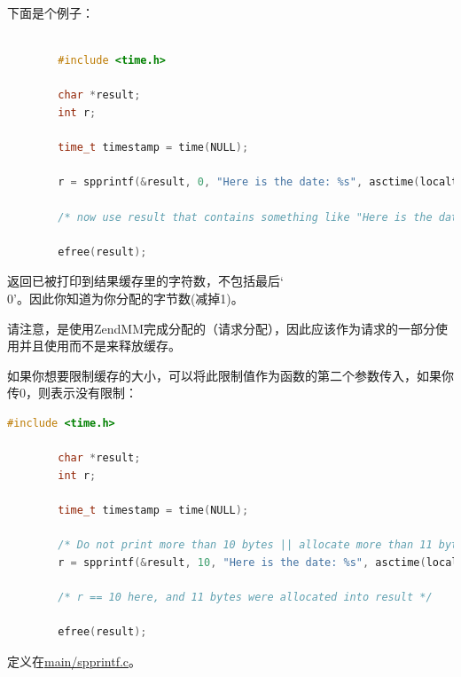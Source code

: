 下面是个例子：

\begin{lstlisting}[language=c]

        #include <time.h>

        char *result;
        int r;
        
        time_t timestamp = time(NULL);
        
        r = spprintf(&result, 0, "Here is the date: %s", asctime(localtime(&timestamp)));
        
        /* now use result that contains something like "Here is the date: Thu Jun 15 19:12:51 2017\n" */
        
        efree(result);  

\end{lstlisting} 


返回已被打印到结果缓存里的字符数，不包括最后‘\\0’。因此你知道为你分配的字节数(减掉1)。

请注意，是使用ZendMM完成分配的（请求分配），因此应该作为请求的一部分使用并且使用而不是来释放缓存。


如果你想要限制缓存的大小，可以将此限制值作为函数的第二个参数传入，如果你传0，则表示没有限制：

\begin{lstlisting}[language=c]
        #include <time.h>

        char *result;
        int r;

        time_t timestamp = time(NULL);

        /* Do not print more than 10 bytes || allocate more than 11 bytes */
        r = spprintf(&result, 10, "Here is the date: %s", asctime(localtime(&timestamp)));

        /* r == 10 here, and 11 bytes were allocated into result */

        efree(result);
\end{lstlisting}        


定义在\href{https://github.com/php/php-src/blob/648be8600ff89e1b0e4a4ad25cebad42b53bed6d/main/spprintf.c}{main/spprintf.c}。


